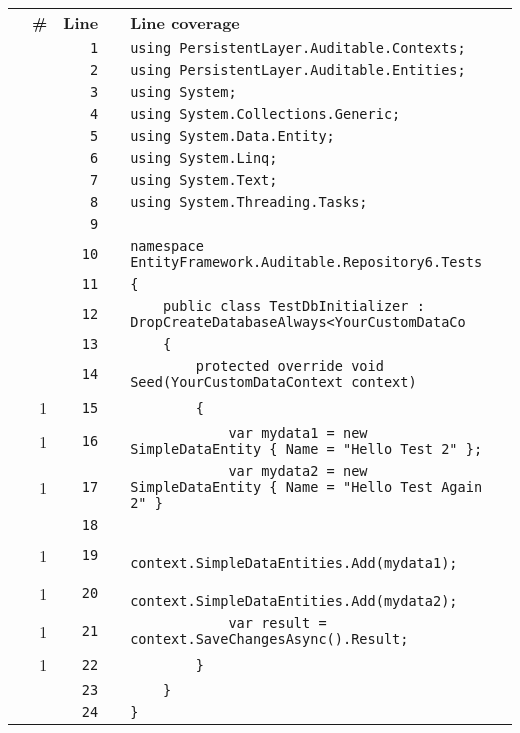 \documentclass[a4paper,10pt]{article}
\begin{document}
\begin{longtable}[l]{lrrll}
\textbf{} & \textbf{\#} & \textbf{Line} & \textbf{} & \textbf{Line coverage}\\
\cellcolor{gray} &  & \verb~1~ & & \verb~using PersistentLayer.Auditable.Contexts;~\\
\cellcolor{gray} &  & \verb~2~ & & \verb~using PersistentLayer.Auditable.Entities;~\\
\cellcolor{gray} &  & \verb~3~ & & \verb~using System;~\\
\cellcolor{gray} &  & \verb~4~ & & \verb~using System.Collections.Generic;~\\
\cellcolor{gray} &  & \verb~5~ & & \verb~using System.Data.Entity;~\\
\cellcolor{gray} &  & \verb~6~ & & \verb~using System.Linq;~\\
\cellcolor{gray} &  & \verb~7~ & & \verb~using System.Text;~\\
\cellcolor{gray} &  & \verb~8~ & & \verb~using System.Threading.Tasks;~\\
\cellcolor{gray} &  & \verb~9~ & & \verb~~\\
\cellcolor{gray} &  & \verb~10~ & & \verb~namespace EntityFramework.Auditable.Repository6.Tests~\\
\cellcolor{gray} &  & \verb~11~ & & \verb~{~\\
\cellcolor{gray} &  & \verb~12~ & & \verb~    public class TestDbInitializer : DropCreateDatabaseAlways<YourCustomDataCo~\\
\cellcolor{gray} &  & \verb~13~ & & \verb~    {~\\
\cellcolor{gray} &  & \verb~14~ & & \verb~        protected override void Seed(YourCustomDataContext context)~\\
\cellcolor{green} & 1 & \verb~15~ & & \verb~        {~\\
\cellcolor{green} & 1 & \verb~16~ & & \verb~            var mydata1 = new SimpleDataEntity { Name = "Hello Test 2" };~\\
\cellcolor{green} & 1 & \verb~17~ & & \verb~            var mydata2 = new SimpleDataEntity { Name = "Hello Test Again 2" }~\\
\cellcolor{gray} &  & \verb~18~ & & \verb~~\\
\cellcolor{green} & 1 & \verb~19~ & & \verb~            context.SimpleDataEntities.Add(mydata1);~\\
\cellcolor{green} & 1 & \verb~20~ & & \verb~            context.SimpleDataEntities.Add(mydata2);~\\
\cellcolor{green} & 1 & \verb~21~ & & \verb~            var result = context.SaveChangesAsync().Result;~\\
\cellcolor{green} & 1 & \verb~22~ & & \verb~        }~\\
\cellcolor{gray} &  & \verb~23~ & & \verb~    }~\\
\cellcolor{gray} &  & \verb~24~ & & \verb~}~\\
\end{longtable}
\newpage
\end{document}
